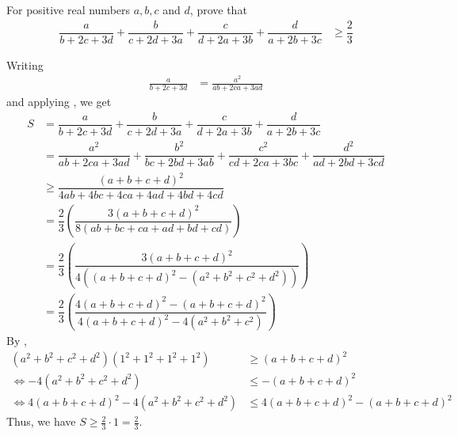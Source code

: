 \documentclass{subfile}
\begin{document}
		\begin{problem}
			For positive real numbers $a,b,c$ and $d$, prove that
				\begin{align*}
					\dfrac{a}{b+2c+3d}+\dfrac{b}{c+2d+3a}+\dfrac{c}{d+2a+3b}+\dfrac{d}{a+2b+3c}
						& \geq \dfrac{2}{3}
				\end{align*}

				\begin{solution}
					Writing
						\begin{align*}
							\frac{a}{b+2c+3d}
								& =\frac{a^{2}}{ab+2ca+3ad}
						\end{align*}
					and applying , we get
						\begin{align*}
							S
								& = \dfrac{a}{b+2c+3d}+\dfrac{b}{c+2d+3a}+\dfrac{c}{d+2a+3b}+\dfrac{d}{a+2b+3c}\\
								& = \dfrac{a^{2}}{ab+2ca+3ad}+\dfrac{b^{2}}{bc+2bd+3ab}+\dfrac{c^{2}}{cd+2ca+3bc}+\dfrac{d^{2}}{ad+2bd+3cd}\\
								& \geq \dfrac{(a+b+c+d)^{2}}{4ab+4bc+4ca+4ad+4bd+4cd}\\
								& = \dfrac{2}{3}\left(\dfrac{3(a+b+c+d)^{2}}{8(ab+bc+ca+ad+bd+cd)}\right)\\
								& = \dfrac{2}{3}\left(\dfrac{3(a+b+c+d)^{2}}{4\left((a+b+c+d)^{2}-(a^{2}+b^{2}+c^{2}+d^{2})\right)}\right)\\
								& = \dfrac{2}{3}\left(\dfrac{4(a+b+c+d)^{2}-(a+b+c+d)^{2}}{4(a+b+c+d)^{2}-4(a^{2}+b^{2}+c^{2})}\right)
						\end{align*}
					By ,
						\begin{align*}
							(a^{2}+b^{2}+c^{2}+d^{2})(1^{2}+1^{2}+1^{2}+1^{2})
								& \geq (a+b+c+d)^{2}\\
							\iff -4(a^{2}+b^{2}+c^{2}+d^{2})
								& \leq -(a+b+c+d)^{2}\\
							\iff 4(a+b+c+d)^{2}-4(a^{2}+b^{2}+c^{2}+d^{2})
								& \leq 4(a+b+c+d)^{2}-(a+b+c+d)^{2}
						\end{align*}
					Thus, we have $S\geq \frac{2}{3}\cdot1=\frac{2}{3}$.
				\end{solution}
		\end{problem}
\end{document}
